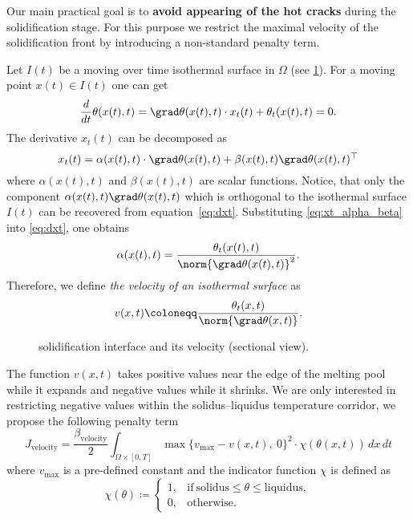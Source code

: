 Our main practical goal is to \textbf{avoid appearing of the hot cracks} during the solidification stage. For this purpose we restrict the maximal velocity of the solidification front by introducing a non-standard penalty term.

Let $I(t)$ be a moving over time isothermal surface in $\Omega$ (see \cref{fig:velocity}). For a moving point $x(t) \in I(t)$ one can get
\begin{equation} \label{eq:dxt}
	\frac{d}{dt} \theta(x(t),t) = \grad \theta(x(t),t) \cdot x_t(t) + \theta_t(x(t),t) = 0.
\end{equation}
The derivative $x_t(t)$ can be decomposed as
\begin{equation} \label{eq:xt_alpha_beta}
	x_t(t) = \alpha(x(t),t) \cdot \grad \theta(x(t),t) + \beta(x(t),t) \grad \theta(x(t),t)^{\top}
\end{equation}
where $\alpha(x(t),t)$ and $\beta(x(t),t)$ are scalar functions. Notice, that only the component $\alpha(x(t),t) \grad \theta(x(t),t)$ which is orthogonal to the isothermal surface $I(t)$ can be recovered from equation~\eqref{eq:dxt}. Substituting \eqref{eq:xt_alpha_beta} into \eqref{eq:dxt}, one obtains
\begin{equation}
	\alpha(x(t),t) = \frac{\theta_t(x(t),t)}{\norm{\grad \theta(x(t),t)}^2}.
\end{equation}
Therefore, we define \emph{the velocity of an isothermal surface} as
\begin{equation}
	v(x,t) \coloneqq \frac{\theta_t(x,t)}{\norm{\grad \theta(x,t)}}.
\end{equation}


\begin{figure}
	\centering
	
	\caption{ solidification interface and its velocity (sectional view).}
	\label{fig:velocity}
\end{figure}

The function $v(x,t)$ takes positive values near the edge of the melting pool while it expands and negative values while it shrinks. We are only interested in restricting negative values within the solidus--liquidus temperature corridor, we propose the following penalty term
\begin{equation}
	J_{\text{velocity}} = \frac{\beta_\text{velocity}}{2}
	\int_{\Omega \times [0,T]} \max \{ v_{\max} - v(x,t),\ 0 \}^2 \cdot \chi(\theta(x,t))\, dx\,dt
\end{equation}where $v_{\max}$ is a pre-defined constant and the indicator function $\chi$ is defined as
\begin{equation}
	\chi(\theta) \coloneqq \left\{
		\begin{array}{ll}
			1, & \text{if}\ \text{solidus} \le \theta \le \text{liquidus}, \\
			0, & \text{otherwise}.
		\end{array} \right.
\end{equation}


